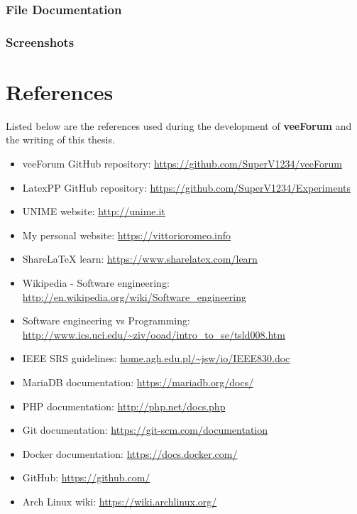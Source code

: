 \documentclass[12pt]{report}
\newcommand{\+}{\discretionary{\mbox{\scriptsize$\hookleftarrow$}}{}{}}
\renewcommand\emph{\textbf}
\begin{document}
        \section{File Documentation}
            
        
        \section{Screenshots}





\part{References}
   
        
        Listed below are the references used during the development of \emph{veeForum} and the writing of this thesis.

        \begin{itemize}
            \item veeForum GitHub repository: \url{https://github.com/SuperV1234/veeForum}
            \item LatexPP GitHub repository: \url{https://github.com/SuperV1234/Experiments}
            \item UNIME website: \url{http://unime.it}
            \item My personal website: \url{https://vittorioromeo.info}

            \item ShareLaTeX learn: \url{https://www.sharelatex.com/learn}
            \item Wikipedia - Software engineering: \url{http://en.wikipedia.org/wiki/Software_engineering}
            \item Software engineering vs Programming: \url{http://www.ics.uci.edu/~ziv/ooad/intro_to_se/tsld008.htm}
            \item IEEE SRS guidelines: \url{home.agh.edu.pl/~jsw/io/IEEE830.doc}
            \item MariaDB documentation: \url{https://mariadb.org/docs/}
            \item PHP documentation: \url{http://php.net/docs.php}
        
            \item Git documentation: \url{https://git-scm.com/documentation}
            \item Docker documentation: \url{https://docs.docker.com/}
            \item GitHub: \url{https://github.com/}
            \item Arch Linux wiki: \url{https://wiki.archlinux.org/}
        \end{itemize}
\end{document}
